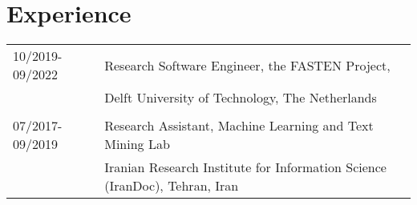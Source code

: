 \section*{Experience}
\begin{longtable}{p{} p{}}
    10/2019-09/2022 & Research Software Engineer, the FASTEN Project, \\
    & Delft University of Technology, The Netherlands \\
    & \\
    07/2017-09/2019 &  Research Assistant, Machine Learning and Text Mining Lab \\
    & Iranian Research Institute for Information Science (IranDoc), Tehran, Iran \\
\end{longtable}

\newpage
